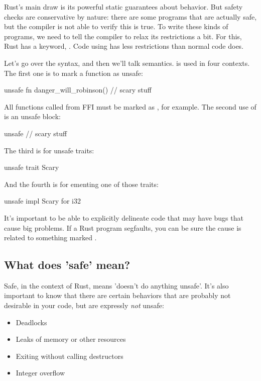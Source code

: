 Rust's main draw is its powerful static guarantees about behavior. But safety checks are conservative by nature: there are some 
programs that are actually safe, but the compiler is not able to verify this is true. To write these kinds of programs, we need to 
tell the compiler to relax its restrictions a bit. For this, Rust has a keyword, . Code using  has less 
restrictions than normal code does.

\blank

Let's go over the syntax, and then we'll talk semantics.  is used in four contexts. The first one is to mark a function 
as unsafe:

\begin{rustc}
unsafe fn danger_will_robinson() {
    // scary stuff
}
\end{rustc}

All functions called from FFI must be marked as , for example. The second use of  is an unsafe block:

\begin{rustc}
unsafe {
    // scary stuff
}
\end{rustc}

The third is for unsafe traits:

\begin{rustc}
unsafe trait Scary { }
\end{rustc}

And the fourth is for ementing one of those traits:

\begin{rustc}
unsafe impl Scary for i32 {}
\end{rustc}

It's important to be able to explicitly delineate code that may have bugs that cause big problems. If a Rust program segfaults, you 
can be sure the cause is related to something marked .

\subsection*{What does 'safe' mean?}

Safe, in the context of Rust, means 'doesn't do anything unsafe'. It's also important to know that there are certain behaviors that 
are probably not desirable in your code, but are expressly \emph{not} unsafe:

\begin{itemize}
  \item{Deadlocks}
  \item{Leaks of memory or other resources}
  \item{Exiting without calling destructors}
  \item{Integer overflow}
\end{itemize}

